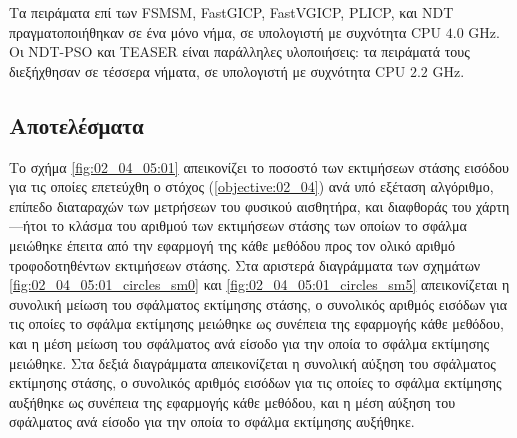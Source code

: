 Τα πειράματα επί των FSMSM, FastGICP, FastVGICP, PLICP, και NDT
πραγματοποιήθηκαν σε ένα μόνο νήμα, σε υπολογιστή με συχνότητα CPU $4.0$ GHz.
Οι NDT-PSO και TEASER είναι παράλληλες υλοποιήσεις: τα πειράματά τους
διεξήχθησαν σε τέσσερα νήματα, σε υπολογιστή με συχνότητα CPU $2.2$ GHz.



\subsection{Αποτελέσματα}
\label{subsection:02_04_05:02}

Το σχήμα \ref{fig:02_04_05:01} απεικονίζει το ποσοστό των εκτιμήσεων στάσης
εισόδου για τις οποίες επετεύχθη ο στόχος (\ref{objective:02_04}) ανά υπό
εξέταση αλγόριθμο, επίπεδο διαταραχών των μετρήσεων του φυσικού αισθητήρα, και
διαφθοράς του χάρτη---ήτοι το κλάσμα του αριθμού των εκτιμήσεων στάσης των
οποίων το σφάλμα μειώθηκε έπειτα από την εφαρμογή της κάθε μεθόδου προς τον
ολικό αριθμό τροφοδοτηθέντων εκτιμήσεων στάσης. Στα αριστερά διαγράμματα των
σχημάτων \ref{fig:02_04_05:01_circles_sm0} και
\ref{fig:02_04_05:01_circles_sm5} απεικονίζεται η συνολική μείωση του σφάλματος
εκτίμησης στάσης, ο συνολικός αριθμός εισόδων για τις οποίες το σφάλμα
εκτίμησης μειώθηκε ως συνέπεια της εφαρμογής κάθε μεθόδου, και η μέση μείωση
του σφάλματος ανά είσοδο για την οποία το σφάλμα εκτίμησης μειώθηκε. Στα δεξιά
διαγράμματα απεικονίζεται η συνολική αύξηση του σφάλματος εκτίμησης στάσης, ο
συνολικός αριθμός εισόδων για τις οποίες το σφάλμα εκτίμησης αυξήθηκε ως
συνέπεια της εφαρμογής κάθε μεθόδου, και η μέση αύξηση του σφάλματος ανά είσοδο
για την οποία το σφάλμα εκτίμησης αυξήθηκε.


